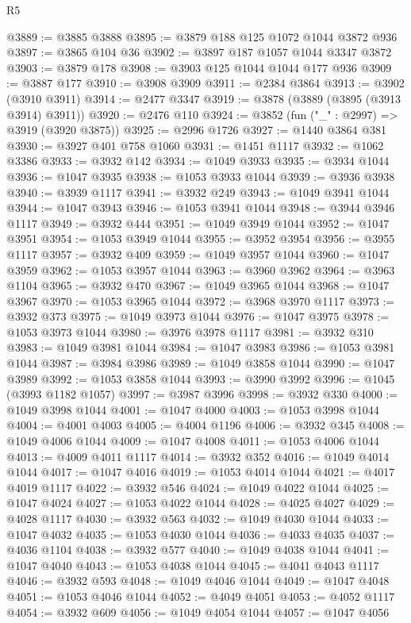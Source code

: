 \begin{lexlean}{R5}
\begin{coremodule}
@3889 := @3885 @3888
@3895 := @3879 @188 @125 @1072 @1044 @3872 @936
@3897 := @3865 @104 @36
@3902 := @3897 @187 @1057 @1044 @3347 @3872
@3903 := @3879 @178
@3908 := @3903 @125 @1044 @1044 @177 @936
@3909 := @3887 @177
@3910 := @3908 @3909
@3911 := @2384 @3864
@3913 := @3902 (@3910 @3911)
@3914 := @2477 @3347
@3919 := @3878 (@3889 (@3895 (@3913 @3914) @3911))
@3920 := @2476 @110
@3924 := @3852 (fun ("_" : @2997) => @3919 (@3920 @3875))
@3925 := @2996 @1726
@3927 := @1440 @3864 @381
@3930 := @3927 @401 @758 @1060
@3931 := @1451 @1117
@3932 := @1062 @3386
@3933 := @3932 @142
@3934 := @1049 @3933
@3935 := @3934 @1044
@3936 := @1047 @3935
@3938 := @1053 @3933 @1044
@3939 := @3936 @3938
@3940 := @3939 @1117
@3941 := @3932 @249
@3943 := @1049 @3941 @1044
@3944 := @1047 @3943
@3946 := @1053 @3941 @1044
@3948 := @3944 @3946 @1117
@3949 := @3932 @444
@3951 := @1049 @3949 @1044
@3952 := @1047 @3951
@3954 := @1053 @3949 @1044
@3955 := @3952 @3954
@3956 := @3955 @1117
@3957 := @3932 @409
@3959 := @1049 @3957 @1044
@3960 := @1047 @3959
@3962 := @1053 @3957 @1044
@3963 := @3960 @3962
@3964 := @3963 @1104
@3965 := @3932 @470
@3967 := @1049 @3965 @1044
@3968 := @1047 @3967
@3970 := @1053 @3965 @1044
@3972 := @3968 @3970 @1117
@3973 := @3932 @373
@3975 := @1049 @3973 @1044
@3976 := @1047 @3975
@3978 := @1053 @3973 @1044
@3980 := @3976 @3978 @1117
@3981 := @3932 @310
@3983 := @1049 @3981 @1044
@3984 := @1047 @3983
@3986 := @1053 @3981 @1044
@3987 := @3984 @3986
@3989 := @1049 @3858 @1044
@3990 := @1047 @3989
@3992 := @1053 @3858 @1044
@3993 := @3990 @3992
@3996 := @1045 (@3993 @1182 @1057)
@3997 := @3987 @3996
@3998 := @3932 @330
@4000 := @1049 @3998 @1044
@4001 := @1047 @4000
@4003 := @1053 @3998 @1044
@4004 := @4001 @4003
@4005 := @4004 @1196
@4006 := @3932 @345
@4008 := @1049 @4006 @1044
@4009 := @1047 @4008
@4011 := @1053 @4006 @1044
@4013 := @4009 @4011 @1117
@4014 := @3932 @352
@4016 := @1049 @4014 @1044
@4017 := @1047 @4016
@4019 := @1053 @4014 @1044
@4021 := @4017 @4019 @1117
@4022 := @3932 @546
@4024 := @1049 @4022 @1044
@4025 := @1047 @4024
@4027 := @1053 @4022 @1044
@4028 := @4025 @4027
@4029 := @4028 @1117
@4030 := @3932 @563
@4032 := @1049 @4030 @1044
@4033 := @1047 @4032
@4035 := @1053 @4030 @1044
@4036 := @4033 @4035
@4037 := @4036 @1104
@4038 := @3932 @577
@4040 := @1049 @4038 @1044
@4041 := @1047 @4040
@4043 := @1053 @4038 @1044
@4045 := @4041 @4043 @1117
@4046 := @3932 @593
@4048 := @1049 @4046 @1044
@4049 := @1047 @4048
@4051 := @1053 @4046 @1044
@4052 := @4049 @4051
@4053 := @4052 @1117
@4054 := @3932 @609
@4056 := @1049 @4054 @1044
@4057 := @1047 @4056

\end{coremodule}
\end{lexlean}

